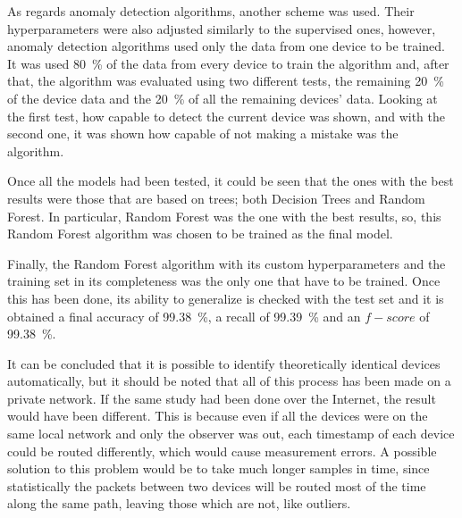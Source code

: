 As regards anomaly detection algorithms, another scheme was used. Their hyperparameters were also adjusted similarly to the supervised ones, however, anomaly detection algorithms used only the data from one device to be trained. It was used \SI{80}{\percent} of the data from every device to train the algorithm and, after that, the algorithm was evaluated using two different tests, the remaining \SI{20}{\percent} of the device data and the \SI{20}{\percent} of all the remaining devices' data. Looking at the first test, how capable to detect the current device was shown, and with the second one, it was shown how capable of not making a mistake was the algorithm.


Once all the models had been tested, it could be seen that the ones with the best results were those that are based on trees; both Decision Trees and Random Forest.  In particular, Random Forest was the one with the best results, so, this Random Forest algorithm was chosen to be trained as the final model. 

Finally, the Random Forest algorithm with its custom hyperparameters and the training set in its completeness was the only one that have to be trained. Once this has been done, its ability to generalize is checked with the test set and it is obtained a final accuracy of \SI{99.38}{\percent}, a recall of \SI{99.39}{\percent} and an $f-score$ of \SI{99.38}{\percent}.


It can be concluded that it is possible to identify theoretically identical devices automatically, but it should be noted that all of this process has been made on a private network. If the same study had been done over the Internet, the result would have been different. This is because even if all the devices were on the same local network and only the observer was out, each timestamp of each device could be routed differently, which would cause measurement errors. A possible solution to this problem would be to take much longer samples in time, since statistically the packets between two devices will be routed most of the time along the same path, leaving those which are not, like outliers. 

